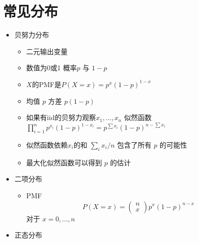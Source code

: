\documentclass[]{book}
\providecommand{\tightlist}{%
  \setlength{\itemsep}{0pt}\setlength{\parskip}{0pt}}
\begin{document}
\section{常见分布}

\begin{itemize}
\tightlist
\item
  贝努力分布

  \begin{itemize}
  \tightlist
  \item
    二元输出变量
  \item
    数值为0或1 概率\(p\) 与 \(1-p\)
  \item
    \(X\)的PMF是\(P(X = x) = p^x (1 - p)^{1 - x}\)
  \item
    均值 \(p\) 方差 \(p(1 - p)\)
  \item
    如果有iid的贝努力观察\(x_1,\ldots, x_n\) 似然函数 \(\prod_{i=1}^n p^{x_i} (1 - p)^{1 - x_i} = p^{\sum x_i} (1 - p)^{n - \sum x_i}\)
  \item
    似然函数依赖\(x_i\)的和 \(\sum_i x_i / n\) 包含了所有 \(p\) 的可能性
  \item
    最大化似然函数可以得到 \(p\) 的估计
  \end{itemize}
\item
  二项分布

  \begin{itemize}
  \tightlist
  \item
    PMF
    \[
    P(X = x) = 
    \left(
    \begin{array}{c}
    n \\ x
    \end{array}
    \right)
    p^x(1 - p)^{n-x}
    \]
    对于 \(x=0,\ldots,n\)
  \end{itemize}
\item
  正态分布


\end{itemize}
\end{document}
